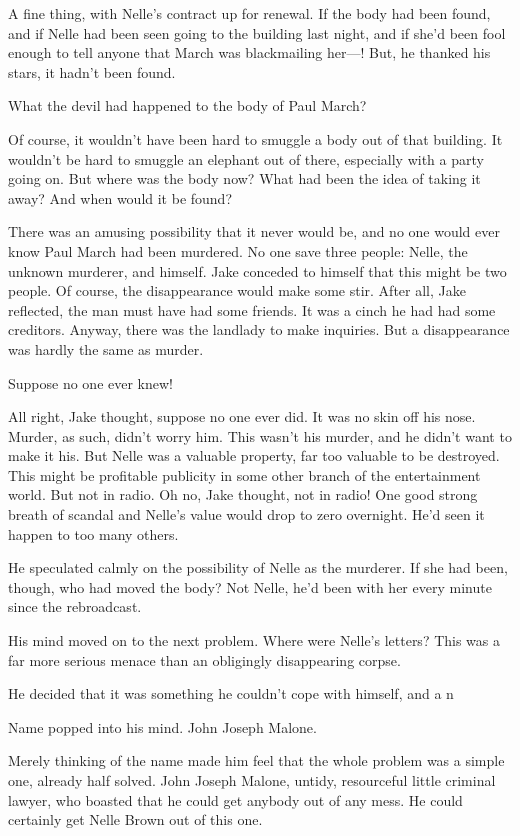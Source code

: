 \documentclass{novel}
\begin{document}
A fine thing, with Nelle’s contract up for renewal. If the body had been found, and if Nelle had been seen going to the building last night, and if she’d been fool enough to tell anyone that March was blackmailing her—! But, he thanked his stars, it hadn’t been found.

What the devil had happened to the body of Paul March?

Of course, it wouldn’t have been hard to smuggle a body out of that building. It wouldn’t be hard to smuggle an elephant out of there, especially with a party going on. But where was the body now? What had been the idea of taking it away? And when would it be found?

There was an amusing possibility that it never would be, and no one would ever know Paul March had been murdered. No one save three people: Nelle, the unknown murderer, and himself. Jake conceded to himself that this might be two people. Of course, the disappearance would make some stir. After all, Jake reflected, the man must have had some friends. It was a cinch he had had some creditors. Anyway, there was the landlady to make inquiries. But a disappearance was hardly the same as murder.

Suppose no one ever knew!

All right, Jake thought, suppose no one ever did. It was no skin off his nose. Murder, as such, didn’t worry him. This wasn’t his murder, and he didn’t want to make it his. But Nelle was a valuable property, far too valuable to be destroyed. This might be profitable publicity in some other branch of the entertainment world. But not in radio. Oh no, Jake thought, not in radio! One good strong breath of scandal and Nelle’s value would drop to zero overnight. He’d seen it happen to too many others.

He speculated calmly on the possibility of Nelle as the murderer. If she had been, though, who had moved the body? Not Nelle, he’d been with her every minute since the rebroadcast.

His mind moved on to the next problem. Where were Nelle’s letters? This was a far more serious menace than an obligingly disappearing corpse.

He decided that it was something he couldn’t cope with himself, and a n

Name popped into his mind. John Joseph Malone.

Merely thinking of the name made him feel that the whole problem was a simple one, already half solved. John Joseph Malone, untidy, resourceful little criminal lawyer, who boasted that he could get anybody out of any mess. He could certainly get Nelle Brown out of this one.
\end{document}
